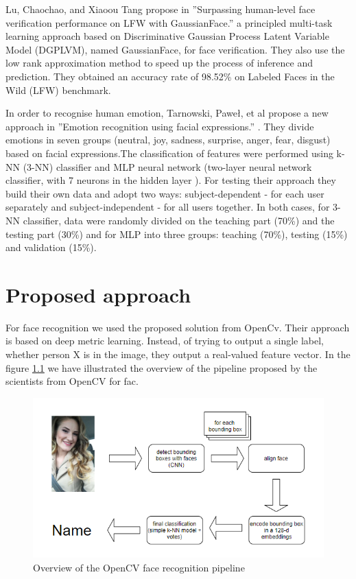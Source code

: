 \documentclass[runningheads,a4paper,11pt]{report}
\begin{document}
    Lu, Chaochao, and Xiaoou Tang propose in ''Surpassing human-level face verification performance on LFW with GaussianFace.'' \cite{lu2015surpassing}  a principled multi-task learning approach based on Discriminative Gaussian Process Latent Variable Model (DGPLVM), named GaussianFace, for face verification. They also use the low rank approximation method to speed up the process of inference and prediction. They obtained an accuracy rate of 98.52\% on Labeled Faces in the Wild (LFW) benchmark.

    In order to recognise human emotion, Tarnowski, Paweł, et al propose a new approach in ''Emotion recognition using facial expressions.'' \cite{tarnowski2017emotion} . They divide emotions in seven groups  (neutral, joy, sadness, surprise, anger, fear, disgust) based on facial expressions.The classification of features were performed using k-NN (3-NN) classifier and MLP neural network (two-layer neural network classifier, with 7 neurons in the hidden layer ). For testing their approach they build their own data and adopt two ways: subject-dependent - for each user separately and subject-independent - for all users together. In both cases, for 3-NN classifier, data were randomly divided on the teaching part (70\%) and the testing part (30\%) and for MLP into three groups: teaching (70\%), testing (15\%) and validation (15\%).


    \chapter{Proposed approach}
    \label{chapter:proposedApproach}

    For face recognition we used the proposed solution from OpenCv. Their approach is based on deep metric learning. Instead, of trying to output a single label, whether person X is in the image, they output a real-valued feature vector. In the figure \ref{img2} we have illustrated the overview of the pipeline proposed by the scientists from OpenCV for fac.

    \begin{figure}[!htb]
        \centering
        \includegraphics[scale=0.9]{Figures/img2.png}
        \caption{Overview of the OpenCV face recognition pipeline}
        \label{img2}
    \end{figure}
\end{document}
